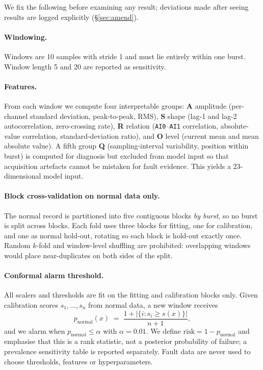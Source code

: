 \documentclass{article}
\begin{document}
We fix the following before examining any result; deviations made after seeing
results are logged explicitly (\S\ref{sec:amend}).

\paragraph{Windowing.} Windows are 10 samples with stride 1 and must lie
entirely within one burst. Window length 5 and 20 are reported as sensitivity.

\paragraph{Features.} From each window we compute four interpretable groups:
\textbf{A} amplitude (per-channel standard deviation, peak-to-peak, RMS),
\textbf{S} shape (lag-1 and lag-2 autocorrelation, zero-crossing rate),
\textbf{R} relation (\texttt{AI0}--\texttt{AI1} correlation, absolute-value
correlation, standard-deviation ratio), and \textbf{O} level (current mean and
mean absolute value). A fifth group \textbf{Q} (sampling-interval variability,
position within burst) is computed for diagnosis but excluded from model input
so that acquisition artefacts cannot be mistaken for fault evidence. This
yields a 23-dimensional model input.

\paragraph{Block cross-validation on normal data only.} The normal record is
partitioned into five contiguous blocks \emph{by burst}, so no burst is split
across blocks. Each fold uses three blocks for fitting, one for calibration,
and one as normal hold-out, rotating so each block is hold-out exactly once.
Random $k$-fold and window-level shuffling are prohibited: overlapping windows
would place near-duplicates on both sides of the split.

\paragraph{Conformal alarm threshold.} All scalers and thresholds are fit on
the fitting and calibration blocks only. Given calibration scores
$s_1,\dots,s_n$ from normal data, a new window receives
\begin{equation}
p_{\text{normal}}(x) \;=\; \frac{1 + |\{i : s_i \ge s(x)\}|}{n+1},
\label{eq:conformal}
\end{equation}
and we alarm when $p_{\text{normal}} \le \alpha$ with $\alpha = 0.01$. We
define $\mathrm{risk} = 1 - p_{\text{normal}}$ and emphasise that this is a
rank statistic, not a posterior probability of failure; a prevalence
sensitivity table is reported separately. Fault data are never used to choose
thresholds, features or hyperparameters.
\end{document}
